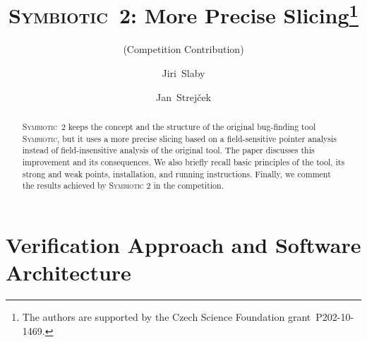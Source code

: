 \documentclass[10pt]{llncs}
\newcommand\tool{\textsc{Symbiotic}\xspace}
\begin{document}

\title{\tool~2: More Precise Slicing\thanks{The authors are supported by the Czech Science
    Foundation grant~P202-10-1469.}}
\subtitle{(Competition Contribution)}
\author{Jiri~Slaby \and Jan~Strej\v{c}ek}

\maketitle

\begin{abstract}
  \tool~2 keeps the concept and the structure of the original bug-finding
  tool \tool, but it uses a more precise slicing based on a field-sensitive
  pointer analysis instead of field-insensitive analysis of the original
  tool. The paper discusses this improvement and its consequences.  We also
  briefly recall basic principles of the tool, its strong and weak points,
  installation, and running instructions. Finally, we comment the results
  achieved by \tool 2 in the competition.
\end{abstract}



\section{Verification Approach and Software Architecture}
\label{sec:approach}
\end{document}
